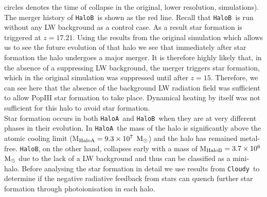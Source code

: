 \documentclass[graphics, twocolumn, usenatbib]{mn2e}
\newcommand{\cloudy}{\texttt{Cloudy~}}
\newcommand{\msolar} {$\rm{M_{\odot}}~$}
\newcommand{\msolarc} {$\rm{M_{\odot}}$}
\newcommand{\ha} {\texttt{HaloA~}}
\newcommand{\hb} {\texttt{HaloB~}}
\newcommand{\hbc} {\texttt{HaloB}}
\begin{document}
circles denotes the time of collapse in the original, lower resolution, simulations). The merger
history of \hb is shown as the red line. Recall that \hb is run without any LW background as
a control case. As a
result star formation is triggered at $z = 17.21$. Using the results from the original simulation
which allows us to see the future evolution of that halo we see that immediately after star formation
the halo undergoes a major merger. It is therefore highly likely that, in the absence of a suppressing
LW background, the merger triggers star formation, which in the original simulation was
suppressed until after $z = 15$. Therefore, we can see here that the absence of the background
LW radiation field was sufficient to allow PopIII star formation to take place. Dynamical heating
by itself was not sufficient for this halo to avoid star formation. \\
\indent Star formation occurs in both \ha and \hb when they are at very different phases in
their evolution.
In \ha the mass of the halo is significantly above the atomic cooling limit
(M$_{\rm{HaloA}} = 9.3 \times 10^7$ \msolarc) and the halo has
remained metal-free. \hbc, on the other hand, collapses early with a mass of
M$_{\rm{HaloB}} = 3.7 \times 10^6$ \msolar due to the lack of a LW background and thus can
be classified as a mini-halo. Before analysing the star formation in detail we use results
from \cloudy to determine if the negative radiative feedback from stars can
quench further star formation through photoionisation in each halo. 
\end{document}
